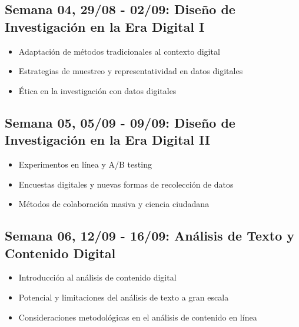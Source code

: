 \documentclass[11pt,letter,]{article}
\providecommand{\tightlist}{%
  \setlength{\itemsep}{0pt}\setlength{\parskip}{0pt}}
\begin{document}
\hypertarget{semana-04-2908---0209-diseuxf1o-de-investigaciuxf3n-en-la-era-digital-i}{%
\subsection{Semana 04, 29/08 - 02/09: Diseño de Investigación en la Era
Digital
I}\label{semana-04-2908---0209-diseuxf1o-de-investigaciuxf3n-en-la-era-digital-i}}

\begin{itemize}
\tightlist
\item
  Adaptación de métodos tradicionales al contexto digital
\item
  Estrategias de muestreo y representatividad en datos digitales
\item
  Ética en la investigación con datos digitales
\end{itemize}

\hypertarget{semana-05-0509---0909-diseuxf1o-de-investigaciuxf3n-en-la-era-digital-ii}{%
\subsection{Semana 05, 05/09 - 09/09: Diseño de Investigación en la Era
Digital
II}\label{semana-05-0509---0909-diseuxf1o-de-investigaciuxf3n-en-la-era-digital-ii}}

\begin{itemize}
\tightlist
\item
  Experimentos en línea y A/B testing
\item
  Encuestas digitales y nuevas formas de recolección de datos
\item
  Métodos de colaboración masiva y ciencia ciudadana
\end{itemize}

\hypertarget{semana-06-1209---1609-anuxe1lisis-de-texto-y-contenido-digital}{%
\subsection{Semana 06, 12/09 - 16/09: Análisis de Texto y Contenido
Digital}\label{semana-06-1209---1609-anuxe1lisis-de-texto-y-contenido-digital}}

\begin{itemize}
\tightlist
\item
  Introducción al análisis de contenido digital
\item
  Potencial y limitaciones del análisis de texto a gran escala
\item
  Consideraciones metodológicas en el análisis de contenido en línea
\end{itemize}
\end{document}
